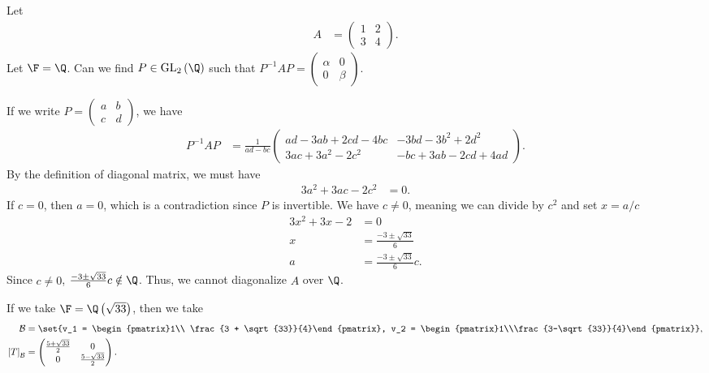 \documentclass[10pt]{mypackage}
\begin{document}
\begin{example}
  Let
  \begin{align*}
    A &= \begin{pmatrix}1& 2\\ 3&4\end{pmatrix}.
  \end{align*}
  Let $\F = \Q$. Can we find $P \in \text{GL}_2\left(\Q\right)$ such that $P^{-1}AP = \begin{pmatrix}\alpha & 0\\ 0 & \beta\end{pmatrix}$.\newline

  If we write $P = \begin{pmatrix}a & b \\c & d\end{pmatrix}$, we have
  \begin{align*}
    P^{-1}AP &= \frac{1}{ad-bc} \begin{pmatrix}ad - 3ab + 2cd - 4bc & -3bd - 3b^2 + 2d^2\\ 3ac + 3a^2 - 2c^2 & -bc + 3ab - 2cd + 4ad\end{pmatrix}.
  \end{align*}
  By the definition of diagonal matrix, we must have
  \begin{align*}
    3a^2 + 3ac - 2c^2 &= 0.
  \end{align*}
  If $c = 0$, then $a = 0$, which is a contradiction since $P$ is invertible. We have $c\neq 0$, meaning we can divide by $c^2$ and set $x = a/c$
  \begin{align*}
    3x^2 + 3x - 2 &= 0\\
    x &= \frac{-3 \pm \sqrt{33}}{6}\\
    a &= \frac{-3 \pm \sqrt{33}}{6}c.
  \end{align*}
  Since $c\neq 0$, $\frac{-3 \pm \sqrt{33}}{6}c \notin \Q$. Thus, we cannot diagonalize $A$ over $\Q$.\newline

  If we take $\F = \Q\left(\sqrt{33}\right)$, then we take
  \begin{align*}
    \mathcal{B} &= \set{v_1 = \begin{pmatrix}1\\ \frac{3 + \sqrt{33}}{4}\end{pmatrix}, v_2 = \begin{pmatrix}1\\\frac{3-\sqrt{33}}{4}\end{pmatrix}},\\
    \left[T\right]_{\mathcal{B}} &= \begin{pmatrix}\frac{5 + \sqrt{33}}{2} & 0 \\ 0 & \frac{5-\sqrt{33}}{2}\end{pmatrix}.
  \end{align*}
\end{example}
\end{document}
